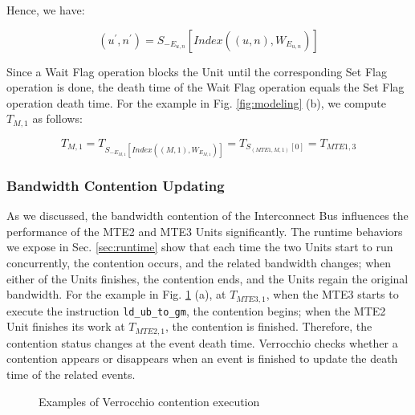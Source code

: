 \documentclass[12pt]{extbook}
\begin{document}
Hence, we have:

\begin{equation}
(u^{\prime}, n^{\prime}) = S_{- E_{u, n}}[Index((u, n), W_{E_{u, n}})]
\end{equation}

Since a Wait Flag operation blocks the Unit until the corresponding Set Flag operation is done, the death time of the Wait Flag operation equals the Set Flag operation death time. For the example in Fig. \ref{fig:modeling} (b), we compute $T_{M, 1}$ as follows:

\begin{equation}
\label{eq:wait}
T_{M, 1} = T_{S_{-E_{M, 1}}[Index((M, 1), W_{E_{M, 1}})]}
    = T_{S_{(MTE1, M, 1)}[0]}
    = T_{MTE1, 3}
\end{equation}

\subsubsection{Bandwidth Contention Updating}

As we discussed, the bandwidth contention of the Interconnect Bus influences the performance of the MTE2 and MTE3 Units significantly. The runtime behaviors we expose in Sec. \ref{sec:runtime} show that each time the two Units start to run concurrently, the contention occurs, and the related bandwidth changes; when either of the Units finishes, the contention ends, and the Units regain the original bandwidth. For the example in Fig. \ref{fig:contention} (a), at $T_{MTE3, 1}$, when the MTE3 starts to execute the instruction \verb|ld_ub_to_gm|, the contention begins; when the MTE2 Unit finishes its work at $T_{MTE2, 1}$, the contention is finished. Therefore, the contention status changes at the event death time. Verrocchio checks whether a contention appears or disappears when an event is finished to update the death time of the related events.

\begin{figure}[tbp]
    \caption{Examples of Verrocchio contention execution}
    \label{fig:contention}
\end{figure}
\end{document}
